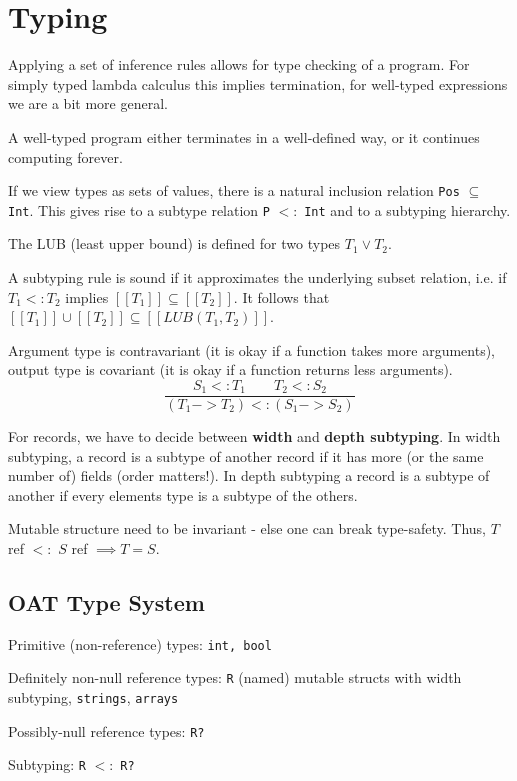 \section*{Typing}

Applying a set of inference rules allows for type checking of a program. For simply typed lambda calculus this implies termination, for well-typed expressions we are a bit more general. \medskip

A well-typed program either terminates in a well-defined way, or it continues computing forever.\medskip
	
If we view types as sets of values, there is a natural inclusion relation \texttt{Pos} $ \subseteq $ \texttt{Int}. This gives rise to a subtype relation \texttt{P} $<:$ \texttt{Int} and to a subtyping hierarchy. \medskip

The LUB (least upper bound) is defined for two types $T_1 \vee T_2$.\medskip
	
A subtyping rule is sound if it approximates the underlying subset relation, i.e. if $T_1 <: T_2$ implies $[[T_1]] \subseteq [[T_2]]$. It follows that $[[T_1]] \cup [[T_2]] \subseteq [[LUB(T_1, T_2)]]$. \medskip
	
Argument type is contravariant (it is okay if a function takes more arguments), output type is covariant (it is okay if a function returns less arguments).
	$$\frac{S_1 <: T_1 \qquad T_2 <: S_2}{(T_1 -> T_2) <: (S_1 -> S_2)}$$\medskip
	
For records, we have to decide between \textbf{width} and \textbf{depth subtyping}. In width subtyping, a record is a subtype of another record if it has more (or the same number of) fields (order matters!). In depth subtyping a record is a subtype of another if every elements type is a subtype of the others.\medskip

Mutable structure need to be invariant - else one can break type-safety. Thus, $T$ ref $<:$ $S$ ref $\implies T = S$.


\subsection*{OAT Type System}

Primitive (non-reference) types: \texttt{int, bool} \medskip
	
Definitely non-null reference types: \texttt{R} (named) mutable structs with width subtyping, \texttt{strings}, \texttt{arrays} \medskip
	
Possibly-null reference types: \texttt{R?} \medskip
	
Subtyping: \texttt{R} $<:$ \texttt{R?}
